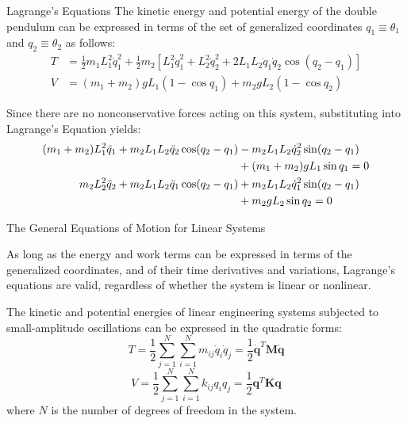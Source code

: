 \documentclass{beamer}
\begin{document}
\begin{frame}{Lagrange's Equations}
  The kinetic energy and potential energy of the double pendulum can be expressed in terms of the set of generalized coordinates \( q_1 \equiv \theta_1 \) and \( q_2 \equiv \theta_2 \) as follows:
  \begin{align*}
      T &= \frac{1}{2} m_1 L_1^2 \dot{q}_1^2 + \frac{1}{2} m_2 \left[ L_1^2 \dot{q}_1^2 + L_2^2 \dot{q}_2^2 + 2 L_1 L_2 \dot{q}_1 \dot{q}_2 \cos(q_2 - q_1) \right] \\
      V &= (m_1 + m_2) g L_1 (1 - \cos q_1) + m_2 g L_2 (1 - \cos q_2)
  \end{align*}
  
  Since there are no nonconservative forces acting on this system, substituting into Lagrange's Equation yields:
  \begin{align*}
    (m_1 + m_2) L_1^2 \ddot{q}_1 + m_2 L_1 L_2 \ddot{q}_2 \cos (q_2 - q_1) &- m_2 L_1 L_2 \dot{q}_2^2 \sin (q_2 - q_1) \notag \\
    &+ (m_1 + m_2) g L_1 \sin q_1 = 0 \\
    m_2 L_2^2 \ddot{q}_2 + m_2 L_1 L_2 \ddot{q}_1 \cos (q_2 - q_1) &+ m_2 L_1 L_2 \dot{q}_1^2 \sin (q_2 - q_1) \notag \\
    &+ m_2 g L_2 \sin q_2 = 0
  \end{align*}
  \end{frame}
  

  \begin{frame}{The General Equations of Motion for Linear Systems}

    As long as the energy and work terms can be expressed in terms of the generalized coordinates, and of their time derivatives and variations, Lagrange's equations are valid, regardless of whether the system is linear or nonlinear.

    \vspace{0.5em}

    The kinetic and potential energies of linear engineering systems subjected to small-amplitude oscillations can be expressed in the quadratic forms:
    \[
    T = \frac{1}{2} \sum_{j=1}^{N} \sum_{i=1}^{N} m_{ij} \dot{q}_i \dot{q}_j = \frac{1}{2} \dot{\mathbf{q}}^T \mathbf{M} \dot{\mathbf{q}}
    \]
    \[
    V = \frac{1}{2} \sum_{j=1}^{N} \sum_{i=1}^{N} k_{ij} q_i q_j = \frac{1}{2} \mathbf{q}^T \mathbf{K} \mathbf{q}
    \]
    where \(N\) is the number of degrees of freedom in the system.
  \end{frame}
\end{document}
